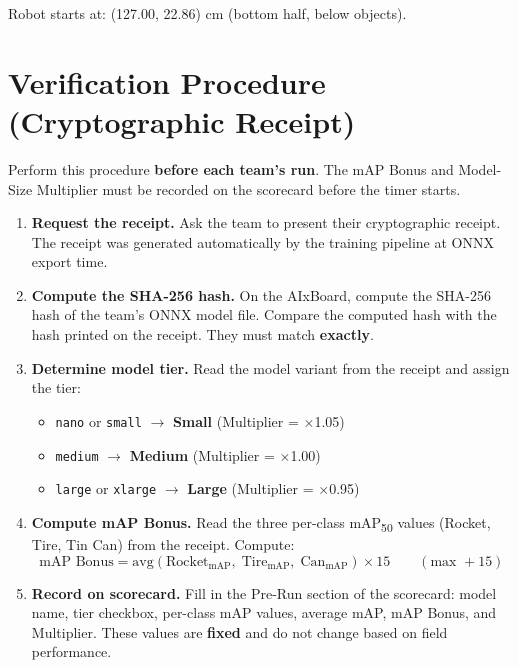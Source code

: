 \documentclass[a4]{article}
\begin{document}
Robot starts at: (127.00, 22.86) cm (bottom half, below objects).

\pagebreak
\section*{Verification Procedure (Cryptographic Receipt)}

Perform this procedure \textbf{before each team's run}. The mAP Bonus and Model-Size Multiplier must be recorded on the scorecard before the timer starts.

\begin{enumerate}
    \item \textbf{Request the receipt.} Ask the team to present their cryptographic receipt. The receipt was generated automatically by the training pipeline at ONNX export time.

    \item \textbf{Compute the SHA-256 hash.} On the AIxBoard, compute the SHA-256 hash of the team's ONNX model file. Compare the computed hash with the hash printed on the receipt. They must match \textbf{exactly}.

    \item \textbf{Determine model tier.} Read the model variant from the receipt and assign the tier:
    \begin{itemize}
        \item \texttt{nano} or \texttt{small} $\rightarrow$ \textbf{Small} (Multiplier = $\times$1.05)
        \item \texttt{medium} $\rightarrow$ \textbf{Medium} (Multiplier = $\times$1.00)
        \item \texttt{large} or \texttt{xlarge} $\rightarrow$ \textbf{Large} (Multiplier = $\times$0.95)
    \end{itemize}

    \item \textbf{Compute mAP Bonus.} Read the three per-class mAP\textsubscript{50} values (Rocket, Tire, Tin Can) from the receipt. Compute:
    \begin{equation*}
    \text{mAP Bonus} = \text{avg}(\text{Rocket}_{\text{mAP}},\;\text{Tire}_{\text{mAP}},\;\text{Can}_{\text{mAP}}) \times 15 \qquad (\text{max } +15)
    \end{equation*}

    \item \textbf{Record on scorecard.} Fill in the Pre-Run section of the scorecard: model name, tier checkbox, per-class mAP values, average mAP, mAP Bonus, and Multiplier. These values are \textbf{fixed} and do not change based on field performance.


\end{enumerate}
\end{document}
